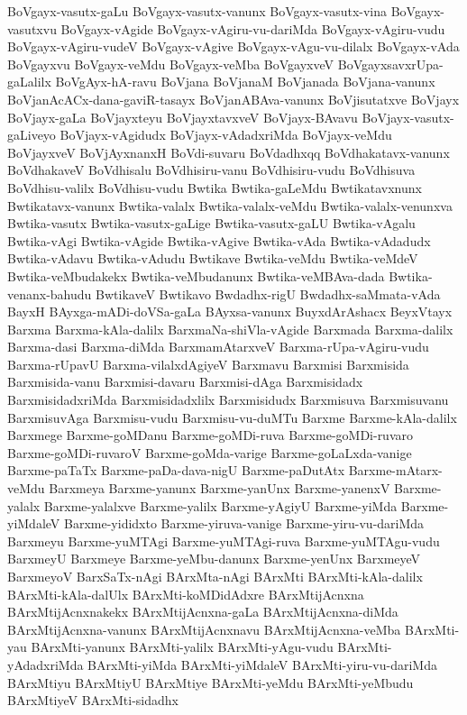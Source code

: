 {BoVgayx-vasutx-gaLu
BoVgayx-vasutx-vanunx
BoVgayx-vasutx-vina
BoVgayx-vasutxvu
BoVgayx-vAgide
BoVgayx-vAgiru-vu-dariMda
BoVgayx-vAgiru-vudu
BoVgayx-vAgiru-vudeV
BoVgayx-vAgive
BoVgayx-vAgu-vu-dilalx
BoVgayx-vAda
BoVgayxvu
BoVgayx-veMdu
BoVgayx-veMba
BoVgayxveV
BoVgayxsavxrUpa-gaLalilx
BoVgAyx-hA-ravu
BoVjana
BoVjanaM
BoVjanada
BoVjana-vanunx
BoVjanAcACx-dana-gaviR-tasayx
BoVjanABAva-vanunx
BoVjisutatxve
BoVjayx
BoVjayx-gaLa
BoVjayxteyu
BoVjayxtavxveV
BoVjayx-BAvavu
BoVjayx-vasutx-gaLiveyo
BoVjayx-vAgidudx
BoVjayx-vAdadxriMda
BoVjayx-veMdu
BoVjayxveV
BoVjAyxnanxH
BoVdi-suvaru
BoVdadhxqq
BoVdhakatavx-vanunx
BoVdhakaveV
BoVdhisalu
BoVdhisiru-vanu
BoVdhisiru-vudu
BoVdhisuva
BoVdhisu-valilx
BoVdhisu-vudu
Bwtika
Bwtika-gaLeMdu
Bwtikatavxnunx
Bwtikatavx-vanunx
Bwtika-valalx
Bwtika-valalx-veMdu
Bwtika-valalx-venunxva
Bwtika-vasutx
Bwtika-vasutx-gaLige
Bwtika-vasutx-gaLU
Bwtika-vAgalu
Bwtika-vAgi
Bwtika-vAgide
Bwtika-vAgive
Bwtika-vAda
Bwtika-vAdadudx
Bwtika-vAdavu
Bwtika-vAdudu
Bwtikave
Bwtika-veMdu
Bwtika-veMdeV
Bwtika-veMbudakekx
Bwtika-veMbudanunx
Bwtika-veMBAva-dada
Bwtika-venanx-bahudu
BwtikaveV
Bwtikavo
Bwdadhx-rigU
Bwdadhx-saMmata-vAda
BayxH
BAyxga-mADi-doVSa-gaLa
BAyxsa-vanunx
BuyxdArAshacx
BeyxVtayx
Barxma
Barxma-kAla-dalilx
BarxmaNa-shiVla-vAgide
Barxmada
Barxma-dalilx
Barxma-dasi
Barxma-diMda
BarxmamAtarxveV
Barxma-rUpa-vAgiru-vudu
Barxma-rUpavU
Barxma-vilalxdAgiyeV
Barxmavu
Barxmisi
Barxmisida
Barxmisida-vanu
Barxmisi-davaru
Barxmisi-dAga
Barxmisidadx
BarxmisidadxriMda
Barxmisidadxlilx
Barxmisidudx
Barxmisuva
Barxmisuvanu
BarxmisuvAga
Barxmisu-vudu
Barxmisu-vu-duMTu
Barxme
Barxme-kAla-dalilx
Barxmege
Barxme-goMDanu
Barxme-goMDi-ruva
Barxme-goMDi-ruvaro
Barxme-goMDi-ruvaroV
Barxme-goMda-varige
Barxme-goLaLxda-vanige
Barxme-paTaTx
Barxme-paDa-dava-nigU
Barxme-paDutAtx
Barxme-mAtarx-veMdu
Barxmeya
Barxme-yanunx
Barxme-yanUnx
Barxme-yanenxV
Barxme-yalalx
Barxme-yalalxve
Barxme-yalilx
Barxme-yAgiyU
Barxme-yiMda
Barxme-yiMdaleV
Barxme-yididxto
Barxme-yiruva-vanige
Barxme-yiru-vu-dariMda
Barxmeyu
Barxme-yuMTAgi
Barxme-yuMTAgi-ruva
Barxme-yuMTAgu-vudu
BarxmeyU
Barxmeye
Barxme-yeMbu-danunx
Barxme-yenUnx
BarxmeyeV
BarxmeyoV
BarxSaTx-nAgi
BArxMta-nAgi
BArxMti
BArxMti-kAla-dalilx
BArxMti-kAla-dalUlx
BArxMti-koMDidAdxre
BArxMtijAcnxna
BArxMtijAcnxnakekx
BArxMtijAcnxna-gaLa
BArxMtijAcnxna-diMda
BArxMtijAcnxna-vanunx
BArxMtijAcnxnavu
BArxMtijAcnxna-veMba
BArxMti-yau
BArxMti-yanunx
BArxMti-yalilx
BArxMti-yAgu-vudu
BArxMti-yAdadxriMda
BArxMti-yiMda
BArxMti-yiMdaleV
BArxMti-yiru-vu-dariMda
BArxMtiyu
BArxMtiyU
BArxMtiye
BArxMti-yeMdu
BArxMti-yeMbudu
BArxMtiyeV
BArxMti-sidadhx
}
